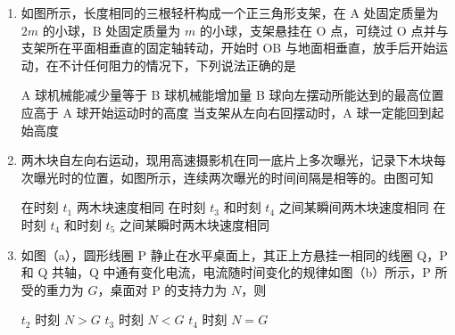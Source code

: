 \documentclass[\gkver]{gaokaozhenti}
\begin{document}
\begin{enumerate}
\item
如图所示，长度相同的三根轻杆构成一个正三角形支架，在 A 处固定质量为 $2m$ 的小球，B 处固定质量为 $m$ 的小球，支架悬挂在 O 点，可绕过 O 点并与支架所在平面相垂直的固定轴转动，开始时 OB 与地面相垂直，放手后开始运动，在不计任何阻力的情况下，下列说法正确的是

\onepicture[w=2.90cm]{}

{A 球机械能减少量等于 B 球机械能增加量}
{B 球向左摆动所能达到的最高位置应高于 A 球开始运动时的高度}
{当支架从左向右回摆动时，A 球一定能回到起始高度}


\item
两木块自左向右运动，现用高速摄影机在同一底片上多次曝光，记录下木块每次曝光时的位置，如图所示，连续两次曝光的时间间隔是相等的。由图可知

\onepicture[w=12.52cm]{}

{在时刻 $t_{1}$ 两木块速度相同}
{在时刻 $t_{3}$ 和时刻 $t_{4}$ 之间某瞬间两木块速度相同}
{在时刻 $t_{4}$ 和时刻 $t_{5}$ 之间某瞬时两木块速度相同}


\item
如图（a），圆形线圈 P 静止在水平桌面上，其正上方悬挂一相同的线圈 Q，P 和 Q 共轴，Q 中通有变化电流，电流随时间变化的规律如图（b）所示，P 所受的重力为 $G$，桌面对 P 的支持力为 $N$，则

\onepicture[w=9.00cm]{}

{$t_{2}$ 时刻 $N>G$}
{$t_{3}$ 时刻 $N<G$}
{$t_{4}$ 时刻 $N=G$}



\end{enumerate}
\end{document}
